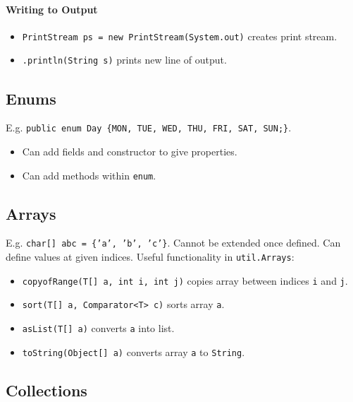 \documentclass[twocolumn,english]{article}
\begin{document}
\paragraph{Writing to Output}
\begin{itemize}
\item \texttt{PrintStream ps = new PrintStream(System.out)} creates print
stream.
\item \texttt{.println(String s)} prints new line of output.
\end{itemize}

\subsection{Enums}

E.g. \texttt{public enum Day \{MON, TUE, WED, THU, FRI, SAT, SUN;\}}.
\begin{itemize}
\item Can add fields and constructor to give properties.
\item Can add methods within \texttt{enum}.
\end{itemize}

\subsection{Arrays}

E.g. \texttt{char{[}{]} abc = \{'a', 'b', 'c'\}}. Cannot be extended
once defined. Can define values at given indices. Useful functionality
in \texttt{util.Arrays}:
\begin{itemize}
\item \texttt{copyofRange(T{[}{]} a, int i, int j)} copies array between
indices \texttt{i} and \texttt{j}.
\item \texttt{sort(T{[}{]} a, Comparator\textless{}T\textgreater{} c)} sorts
array \texttt{a}.
\item \texttt{asList(T{[}{]} a)} converts \texttt{a} into list.
\item \texttt{toString(Object{[}{]} a)} converts array \texttt{a} to \texttt{String}.
\end{itemize}

\subsection{Collections}
\end{document}
